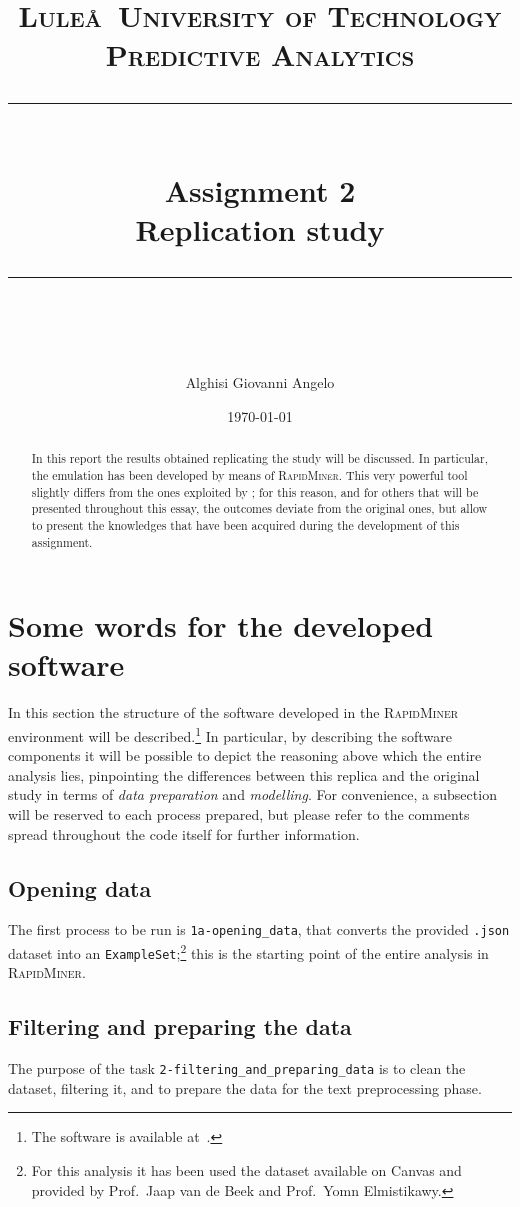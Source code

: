 \documentclass[a4paper]{article}
\title{
	\large 
	\textsc{Lule\aa~University of Technology\\[5pt] 
		Predictive Analytics} \\[10pt]
	\rule{\linewidth}{0.5pt}\\
	\vspace{0.3cm}
	\Large Assignment 2\\
	\vspace{0.3cm}
	\huge \bf Replication study\normalsize
	\vspace{0.3cm}
	\rule{\linewidth}{0.5pt}  \\
}
\author{Alghisi Giovanni Angelo}
\date{\normalsize \today}
\begin{document}
	
	\maketitle
	
	\begin{abstract}
		In this report the results obtained replicating the study \cite{article:muller} will be discussed. In particular, the emulation has been developed by means of \textsc{RapidMiner}. This very powerful tool slightly differs from the ones exploited by \citeauthor{article:muller}; for this reason, and for others that will be presented throughout this essay, the outcomes deviate from the original ones, but allow to present the knowledges that have been acquired during the development of this assignment. 
	\end{abstract}
	
	\tableofcontents
	
	
	\section{Some words for the developed software}
		In this section the structure of the software developed in the \textsc{RapidMiner} environment will be described.\footnote{The software is available at~\cite{repo:pa-assignment-2}.} In particular, by describing the software components it will be possible to depict the reasoning above which the entire analysis lies, pinpointing the differences between this replica and the original study in terms of \emph{data preparation} and \emph{modelling}. For convenience, a subsection will be reserved to each process prepared, but please refer to the comments spread throughout the code itself for further information.
		
		\subsection{Opening data}
		 	The first process to be run is \verb|1a-opening_data|, that converts the provided \verb|.json| dataset into an \verb|ExampleSet|;\footnote{For this analysis it has been used the dataset available on Canvas and provided by Prof.~Jaap van de Beek and Prof.~Yomn Elmistikawy.} this is the starting point of the entire analysis in \textsc{RapidMiner}.
		 
		 \subsection{Filtering and preparing the data}
		 	The purpose of the task \verb*|2-filtering_and_preparing_data| is to clean the dataset, filtering it, and to prepare the data for the text preprocessing phase.
		 	
\end{document}
